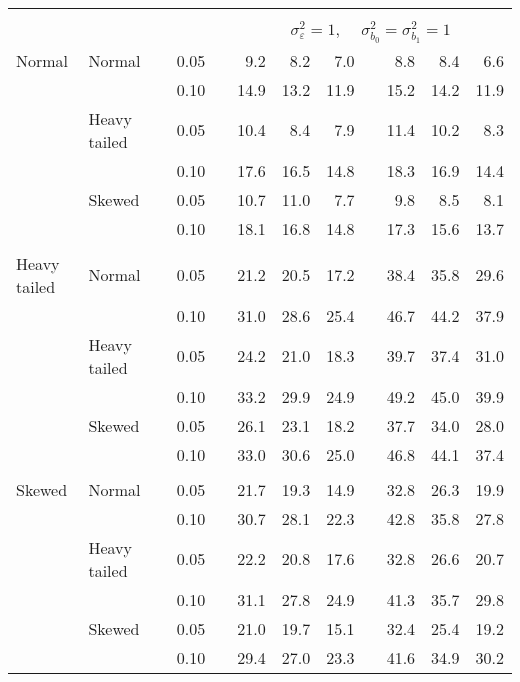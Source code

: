 \begin{table}[ht]
\begin{scriptsize}
\begin{tabular}{ll p{.1cm} c p{.1cm} rrr p{.1cm} rrr}
&&&&&&&&&&&\\
& && && \multicolumn{7}{c}{$\sigma_{\varepsilon}^2 = 1$, \ \ $\sigma_{b_0}^2 = \sigma_{b_1}^2 = 1$} \\ \cline{6-12}
\rowcolor{gray!20} Normal & Normal &  & 0.05 &  & 9.2 & 8.2 & 7.0 &  & 8.8 & 8.4 & 6.6 \\ 
\rowcolor{gray!20}    &  &  & 0.10 &  & 14.9 & 13.2 & 11.9 &  & 15.2 & 14.2 & 11.9 \\ 
\rowcolor{gray!20}    & Heavy tailed &  & 0.05 &  & 10.4 & 8.4 & 7.9 &  & 11.4 & 10.2 & 8.3 \\ 
\rowcolor{gray!20}    &  &  & 0.10 &  & 17.6 & 16.5 & 14.8 &  & 18.3 & 16.9 & 14.4 \\ 
\rowcolor{gray!20}    & Skewed &  & 0.05 &  & 10.7 & 11.0 & 7.7 &  & 9.8 & 8.5 & 8.1 \\ 
\rowcolor{gray!20}    &  &  & 0.10 &  & 18.1 & 16.8 & 14.8 &  & 17.3 & 15.6 & 13.7 \\ 
&&&&&&&&&&&\\
  Heavy tailed & Normal &  & 0.05 &  & 21.2 & 20.5 & 17.2 &  & 38.4 & 35.8 & 29.6 \\ 
  &  &  & 0.10 &  & 31.0 & 28.6 & 25.4 &  & 46.7 & 44.2 & 37.9 \\ 
  & Heavy tailed &  & 0.05 &  & 24.2 & 21.0 & 18.3 &  & 39.7 & 37.4 & 31.0 \\ 
  & &  & 0.10 &  & 33.2 & 29.9 & 24.9 &  & 49.2 & 45.0 & 39.9 \\ 
  & Skewed &  & 0.05 &  & 26.1 & 23.1 & 18.2 &  & 37.7 & 34.0 & 28.0 \\ 
  &  &  & 0.10 &  & 33.0 & 30.6 & 25.0 &  & 46.8 & 44.1 & 37.4 \\ 
&&&&&&&&&&&\\
  Skewed & Normal &  & 0.05 &  & 21.7 & 19.3 & 14.9 &  & 32.8 & 26.3 & 19.9 \\ 
   &  &  & 0.10 &  & 30.7 & 28.1 & 22.3 &  & 42.8 & 35.8 & 27.8 \\ 
   & Heavy tailed &  & 0.05 &  & 22.2 & 20.8 & 17.6 &  & 32.8 & 26.6 & 20.7 \\ 
   &  &  & 0.10 &  & 31.1 & 27.8 & 24.9 &  & 41.3 & 35.7 & 29.8 \\ 
   & Skewed &  & 0.05 &  & 21.0 & 19.7 & 15.1 &  & 32.4 & 25.4 & 19.2 \\ 
   &  &  & 0.10 &  & 29.4 & 27.0 & 23.3 &  & 41.6 & 34.9 & 30.2 \\ 



\end{tabular}
\end{scriptsize}
\end{table}
